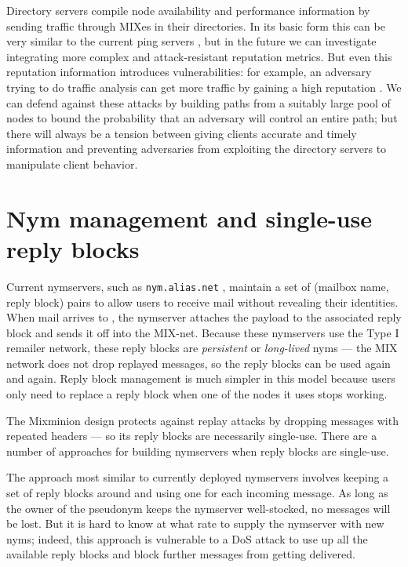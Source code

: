 \documentclass{llncs}
\newcommand\emailaddr{\begingroup \def\UrlLeft{<}\def\UrlRight{>}\urlstyle{tt}\Url}
\begin{document}
Directory servers compile node availability and performance information by
sending traffic through MIXes in their directories. In its basic form this
can be very similar to the current ping servers \cite{levien}, but in the
future we can investigate integrating more complex and attack-resistant
reputation metrics. But even this reputation information introduces
vulnerabilities: for example, an adversary trying to do traffic analysis
can get more traffic by gaining a high reputation \cite{mix-acc}. We can
defend against these attacks by building paths from a suitably large pool
of nodes \cite{casc-rep} to bound the probability that an adversary will
control an entire path; but there will always be a tension between giving
clients accurate and timely information and preventing adversaries from
exploiting the directory servers to manipulate client behavior.



\section{Nym management and single-use reply blocks}
\label{sec:nymservers}

Current nymservers, such as {\tt nym.alias.net} \cite{nym-alias-net},
maintain a set of (mailbox name, reply block) pairs to allow users to
receive mail without revealing their identities. When mail arrives to
\emailaddr{bob@nym.alias.net}, the nymserver attaches the payload to
the associated
reply block and sends it off into the MIX-net. Because these nymservers
use the Type I remailer network, these reply blocks are \emph{persistent}
or \emph{long-lived} nyms --- the MIX network does not drop replayed
messages, so the reply blocks can be used again and again. Reply block
management is much simpler in this model because users only need to
replace a reply block when one of the nodes it uses stops working.

The Mixminion design protects against replay attacks by dropping
messages with repeated headers --- so its reply blocks are necessarily
single-use. There are a number of approaches for building nymservers
when reply blocks are single-use.

The approach most similar to currently deployed nymservers involves
keeping a set of reply blocks around and using one for each incoming
message. As long as the owner of the pseudonym keeps the nymserver
well-stocked, no messages will be lost. But it is hard to know at what
rate to supply the nymserver with new nyms; indeed, this approach is
vulnerable to a DoS attack to use up all the available reply blocks and
block further messages from getting delivered.
\end{document}
